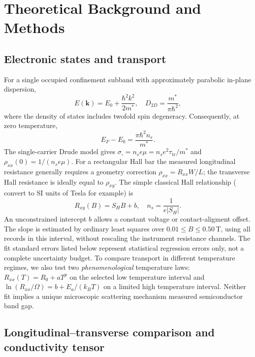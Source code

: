 \documentclass[
    aps,
    prb, 
    twocolumn, superscriptaddress,
    amsmath,
    amssymb,
    floatfix
]{revtex4-2}
\begin{document}
\section{Theoretical Background and Methods}
\label{sec:theory}
\subsection{Electronic states and transport}
For a single occupied confinement subband with approximately parabolic in-plane dispersion,
\begin{equation}
    E(\mathbf{k})=E_0+\frac{\hbar^2 k^2} {2m^*}, \quad D_{2D}=\frac{m^*}{\pi\hbar^2},
\end{equation}
where the density of states includes twofold spin degeneracy. Consequently, at zero temperature, 
\begin{equation}
    E_F-E_0=\frac{\pi\hbar^2 n_s}{m^*}. \label{eq:fermi} 
\end{equation}
The single-carrier Drude model gives $\sigma_\square=n_s e\mu=n_s e^2 \tau_{\mathrm{tr}}/m^*$ and $\rho_{xx}(0)=1/(n_s e\mu)$. For a rectangular Hall bar the measured longitudinal resistance generally requires a geometry correction $\rho _{xx} = R_{xx} W/L$; the transverse Hall resistance is ideally equal to $\rho_{xy}$. The simple classical Hall relationship  ( convert to SI units of Tesla for example) is 
\begin{equation}
    R_{xy}(B)=S_H B+b,\quad n_s=\frac {1} {e|S_H|}. \label{eq:hall}
\end{equation}
An unconstrained intercept $b$ allows a constant voltage or contact-aligment offset. The slope is estimated by ordinary least squares over $0.01\le B\le 0.50\,$T, using all records in this interval, without rescaling the instrument resistance channels. The fit standard errors listed below represent statistical regression errors only, not a complete uncertainty budget. To compare transport in different temperature regimes, we also test two \emph{phenomenological} temperature laws: $R_{xx}(T) = R_0+aT^p$ on the selected low temperature interval and $\ln(R_{xx}/\Omega)=b+E_a/(k_BT)$ on a limited high temperature interval. Neither fit implies a unique microscopic scattering mechanism measured semiconductor band gap.

\subsection{Longitudinal–transverse comparison and conductivity tensor}
\end{document}
